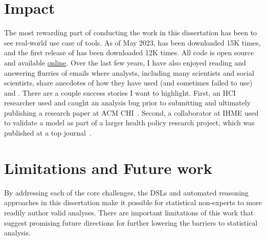 \section{Impact}
The most rewarding part of conducting the work in this dissertation has been to
see real-world use case of tools. As of May 2023, \tea has been downloaded 15K
times, and the first release of \tisane has been downloaded 12K times. All code
is open source and available \href{https://github.com/tea-lang-org}{online}.
Over the last few years, I have also enjoyed reading and answering flurries of
emails where analysts, including many scientists and social scientists, share
anecdotes of how they have used (and sometimes failed to use) \tea and \tisane.
There are a couple success stories I want to highlight. First, an HCI researcher
used \tisane and caught an analysis bug prior to submitting and ultimately
publishing a research paper at ACM CHI~\cite{baughan2022dissociation}. Second, a
collaborator at IHME used \tisane to validate a model as part of a larger health
policy research project, which was published at a top
journal~\cite{johnson2022varied}.

\section{Limitations and Future work} \label{sec:futureWork}
By addressing each of the core challenges, the DSLs and automated reasoning
approaches in this dissertation make it possible for statistical non-experts to
more readily author valid analyses. There are important limitations of this work
that suggest promising future directions for further lowering the barriers to
statistical analysis. 

